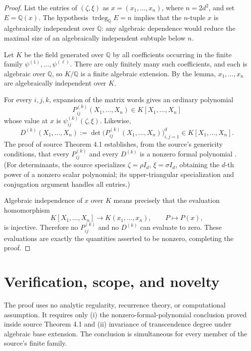 \documentclass[11pt]{article}
\newcommand{\Q}{\mathbb{Q}}
\newcommand{\trdeg}{\operatorname{trdeg}}
\begin{document}
\begin{proof}
List the entries of \((\zeta,\xi)\) as
\(x=(x_1,\dots,x_n)\), where \(n=2d^2\), and set \(E=\Q(x)\).
The hypothesis \(\trdeg_\Q E=n\) implies that the \(n\)-tuple \(x\) is
algebraically independent over \(\Q\): any algebraic dependence would reduce
the maximal size of an algebraically independent subtuple below \(n\).

Let \(K\) be the field generated over \(\Q\) by all coefficients occurring in
the finite family \(\psi^{(1)},\dots,\psi^{(\ell)}\). There are only finitely
many such coefficients, and each is algebraic over \(\Q\), so \(K/\Q\) is a
finite algebraic extension. By the lemma, \(x_1,\dots,x_n\) are algebraically
independent over \(K\).

For every \(i,j,k\), expansion of the matrix words gives an ordinary
polynomial
\[
 P^{(k)}_{ij}(X_1,\dots,X_n)\in K[X_1,\dots,X_n]
\]
whose value at \(x\) is \(\psi^{(k)}_{ij}(\zeta,\xi)\). Likewise,
\[
 D^{(k)}(X_1,\dots,X_n)
 :=\det\bigl(P^{(k)}_{ij}(X_1,\dots,X_n)\bigr)_{i,j=1}^d
 \in K[X_1,\dots,X_n].
\]
The proof of source Theorem 4.1 establishes, from the source's genericity
conditions, that every \(P^{(k)}_{ij}\) and every \(D^{(k)}\) is a nonzero
formal polynomial \cite[pp.~6--7]{RS}. (For determinants, the source
specializes \(\zeta=\rho I_d\), \(\xi=\sigma I_d\), obtaining the \(d\)-th
power of a nonzero scalar polynomial; its upper-triangular specialization and
conjugation argument handles all entries.)

Algebraic independence of \(x\) over \(K\) means precisely that the evaluation
homomorphism
\[
 K[X_1,\dots,X_n]\longrightarrow K(x_1,\dots,x_n),
 \qquad P\longmapsto P(x),
\]
is injective. Therefore no \(P^{(k)}_{ij}\) and no \(D^{(k)}\) can evaluate
to zero. These evaluations are exactly the quantities asserted to be
nonzero, completing the proof.
\end{proof}

\section{Verification, scope, and novelty}

The proof uses no analytic regularity, recurrence theory, or computational
assumption. It requires only (i) the nonzero-formal-polynomial conclusion
proved inside source Theorem 4.1 and (ii) invariance of transcendence degree
under algebraic base extension. The conclusion is simultaneous for every
member of the source's finite family.
\end{document}
